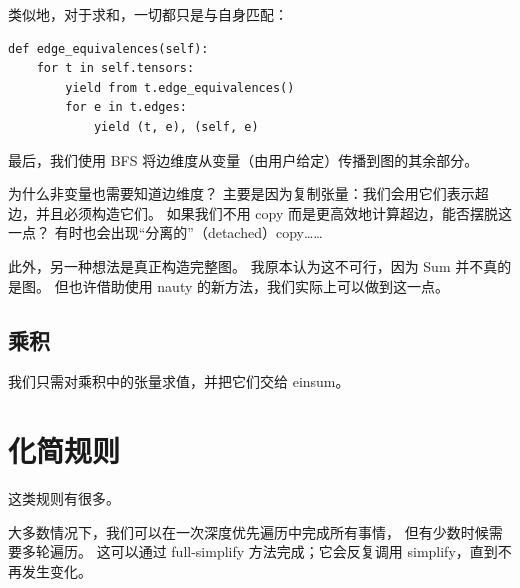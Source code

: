 类似地，对于求和，一切都只是与自身匹配：
\begin{lstlisting}
def edge_equivalences(self):
    for t in self.tensors:
        yield from t.edge_equivalences()
        for e in t.edges:
            yield (t, e), (self, e)
\end{lstlisting}

最后，我们使用 BFS 将边维度从变量（由用户给定）传播到图的其余部分。

为什么非变量也需要知道边维度？
主要是因为复制张量：我们会用它们表示超边，并且必须构造它们。
如果我们不用 copy 而是更高效地计算超边，能否摆脱这一点？
有时也会出现“分离的”（detached）copy……

此外，另一种想法是真正构造完整图。
我原本认为这不可行，因为 Sum 并不真的是图。
但也许借助使用 nauty 的新方法，我们实际上可以做到这一点。

\subsection{乘积}
我们只需对乘积中的张量求值，并把它们交给 einsum。


\section{化简规则}
这类规则有很多。

大多数情况下，我们可以在一次深度优先遍历中完成所有事情，
但有少数时候需要多轮遍历。
这可以通过 full-simplify 方法完成；它会反复调用 simplify，直到不再发生变化。
